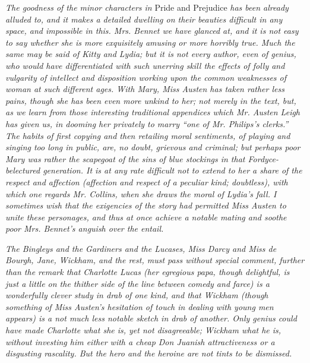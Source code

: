 \documentclass[12pt]{book}
\begin{document}
\textit{The goodness of the minor characters in} Pride and Prejudice \textit{has been already alluded to, and it makes a detailed dwelling on their beauties difficult in any space, and impossible in this. Mrs. Bennet we have glanced at, and it is not easy to say whether she is more exquisitely amusing or more horribly true. Much the same may be said of Kitty and Lydia; but it is not every author, even of genius, who would have differentiated with such unerring skill the effects of folly and vulgarity of intellect and disposition working upon the common weaknesses of woman at such different ages. With Mary, Miss Austen has taken rather less pains, though she has been even more unkind to her; not merely in the text, but, as we learn from those interesting traditional appendices which Mr. Austen Leigh has given us, in dooming her privately to marry ``one of Mr. Philips's clerks.'' The habits of first copying and then retailing moral sentiments, of playing and singing too long in public, are, no doubt, grievous and criminal; but perhaps poor Mary was rather the scapegoat of the sins of blue stockings in that Fordyce-belectured generation. It is at any rate difficult not to extend to her a share of the respect and affection (affection and respect of a peculiar kind; doubtless), with which one regards Mr. Collins, when she draws the moral of Lydia's fall. I sometimes wish that the exigencies of the story had permitted Miss Austen to unite these personages, and thus at once achieve a notable mating and soothe poor Mrs. Bennet's anguish over the entail.}

\textit{The Bingleys and the Gardiners and the Lucases, Miss Darcy and Miss de Bourgh, Jane, Wickham, and the rest, must pass without special comment, further than the remark that Charlotte Lucas (her egregious papa, though delightful, is just a little on the thither side of the line between comedy and farce) is a wonderfully clever study in drab of one kind, and that Wickham (though something of Miss Austen's hesitation of touch in dealing with young men appears) is a not much less notable sketch in drab of another. Only genius could have made Charlotte what she is, yet not disagreeable; Wickham what he is, without investing him either with a cheap Don Juanish attractiveness or a disgusting rascality. But the hero and the heroine are not tints to be dismissed.}
\end{document}
